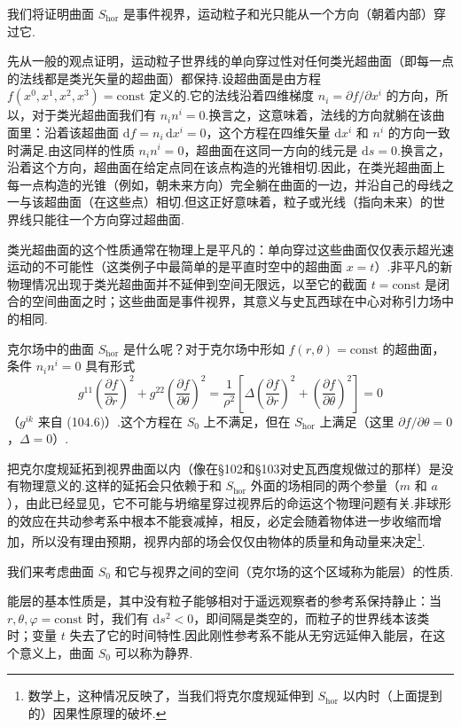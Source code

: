 我们将证明曲面 $S_{\mathrm{hor}}$ 是事件视界，运动粒子和光只能从一个方向（朝着内部）穿过它.

先从一般的观点证明，运动粒子世界线的单向穿过性对任何类光超曲面（即每一点的法线都是类光矢量的超曲面）都保持.设超曲面是由方程 $f(x^0,x^1,x^2,x^3)=\mathrm{const}$ 定义的.它的法线沿着四维梯度 $n_i=\partial f/\partial x^i$ 的方向，所以，对于类光超曲面我们有 $n_in^i=0$.换言之，这意味着，法线的方向就躺在该曲面里：沿着该超曲面 $\mathrm{d}f=n_i\,\mathrm{d}x^i=0$，这个方程在四维矢量 $\mathrm{d}x^i$ 和 $n^i$ 的方向一致时满足.由这同样的性质 $n_in^i=0$，超曲面在这同一方向的线元是 $\mathrm{d}s=0$.换言之，沿着这个方向，超曲面在给定点同在该点构造的光锥相切.因此，在类光超曲面上每一点构造的光锥（例如，朝未来方向）完全躺在曲面的一边，并沿自己的母线之一与该超曲面（在这些点）相切.但这正好意味着，粒子或光线（指向未来）的世界线只能往一个方向穿过超曲面.

类光超曲面的这个性质通常在物理上是平凡的：单向穿过这些曲面仅仅表示超光速运动的不可能性（这类例子中最简单的是平直时空中的超曲面 $x=t$）.非平凡的新物理情况出现于类光超曲面并不延伸到空间无限远，以至它的截面 $t=\mathrm{const}$ 是闭合的空间曲面之时；这些曲面是事件视界，其意义与史瓦西球在中心对称引力场中的相同.

克尔场中的曲面 $S_{\mathrm{hor}}$ 是什么呢？对于克尔场中形如 $f(r,\theta)=\mathrm{const}$ 的超曲面，条件 $n_in^i=0$ 具有形式
\begin{equation}
  g^{11}\left(\frac{\partial f}{\partial r}\right)^{2}
  +g^{22}\left(\frac{\partial f}{\partial\theta}\right)^{2}
  =\frac{1}{\rho^{2}}\left[\varDelta\left(\frac{\partial f}{\partial r}\right)^{2}
  +\left(\frac{\partial f}{\partial\theta}\right)^{2}\right]=0
\end{equation}
（$g^{ik}$ 来自 (104.6)）.这个方程在 $S_0$ 上不满足，但在 $S_{\mathrm{hor}}$ 上满足（这里 $\partial f/\partial\theta=0$，$\varDelta=0$）.

把克尔度规延拓到视界曲面以内（像在§102和§103对史瓦西度规做过的那样）是没有物理意义的.这样的延拓会只依赖于和 $S_{\mathrm{hor}}$ 外面的场相同的两个参量（$m$ 和 $a$），由此已经显见，它不可能与坍缩星穿过视界后的命运这个物理问题有关.非球形的效应在共动参考系中根本不能衰减掉，相反，必定会随着物体进一步收缩而增加，所以没有理由预期，视界内部的场会仅仅由物体的质量和角动量来决定\footnote{数学上，这种情况反映了，当我们将克尔度规延伸到 $S_{\mathrm{hor}}$ 以内时（上面提到的）因果性原理的破坏.}.

我们来考虑曲面 $S_0$ 和它与视界之间的空间（克尔场的这个区域称为能层）的性质.

能层的基本性质是，其中没有粒子能够相对于遥远观察者的参考系保持静止：当 $r,\theta,\varphi=\mathrm{const}$ 时，我们有 $\mathrm{d}s^{2}<0$，即间隔是类空的，而粒子的世界线本该类时；变量 $t$ 失去了它的时间特性.因此刚性参考系不能从无穷远延伸入能层，在这个意义上，曲面 $S_0$ 可以称为静界.

